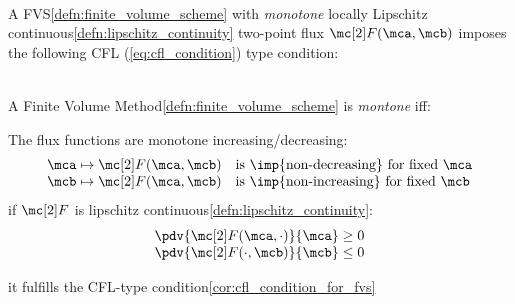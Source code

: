 \begin{corbox}\nospacing
    \begin{cor}\label{cor:cfl_condition_for_fvs}\leavevmode\\
        A FVS\cref{defn:finite_volume_scheme} with \textit{monotone} locally Lipschitz continuous\cref{defn:lipschitz_continuity} two-point flux $\Flux(\mca,\mcb)$
        imposes the following CFL (\cref{eq:cfl_condition}) type condition:\leavevmode\\
    \end{cor}
\end{corbox}
\begin{corbox}\nospacing
    \begin{cor}\label{cor:monotone_fvm}\leavevmode\\
        A Finite Volume Method\cref{defn:finite_volume_scheme} is \textit{montone} iff:
        \begin{circlelistnosep}
            \item The flux functions are monotone increasing/decreasing:
        \begin{align}
          &\mca\mapsto\Flux(\mca,\mcb)&&\text{is \imp{non-decreasing} for fixed }\mca \\[-1\jot]
          &\mcb\mapsto\Flux(\mca,\mcb)&&\text{is \imp{non-increasing} for fixed }\mcb
        \end{align}
        if $\Flux$ is lipschitz continuous\cref{defn:lipschitz_continuity}:
        \begin{align}
          &\pdv{\Flux(\mca,\cdot)}{\mca}\geq0\label{eq:monotone_fvm_lipschitz_inc}\\[-1\jot]
          &\pdv{\Flux(\cdot,\mcb)}{\mcb}\leq0\label{eq:monotone_fvm_lipschitz_dec}
        \end{align}
        \item it fulfills the CFL-type condition\cref{cor:cfl_condition_for_fvs}
        \end{circlelistnosep}
    \end{cor}
\end{corbox}
